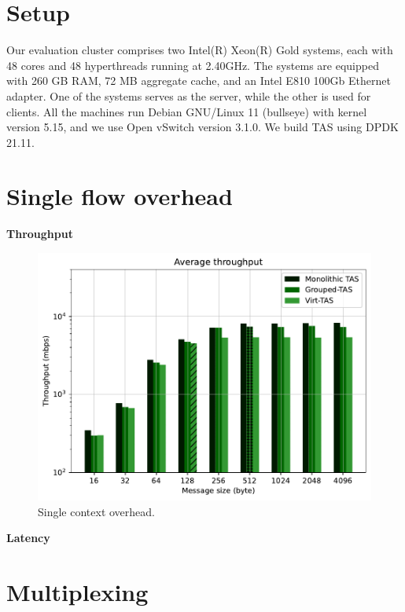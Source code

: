 \section{Setup}

Our evaluation cluster comprises two Intel(R) Xeon(R) Gold systems, 
each with 48 cores and 48 hyperthreads running at 2.40GHz. The systems 
are equipped with 260 GB RAM, 72 MB aggregate cache, and an Intel E810 
100Gb Ethernet adapter. One of the systems serves as the server, while 
the other is used for clients. All the machines run Debian GNU/Linux 11 
(bullseye) with kernel version 5.15, and we use Open vSwitch version 3.1.0. 
We build TAS using DPDK 21.11.

\section{Single flow overhead}

\textbf{Throughput}

\begin{figure}
    \centering
    \includegraphics[scale=0.8]{../results/overhead.throughput.pdf}
    \caption{Single context overhead.}
    \label{fig:overhead.throughput}
\end{figure}

\textbf{Latency}





\section{Multiplexing}

